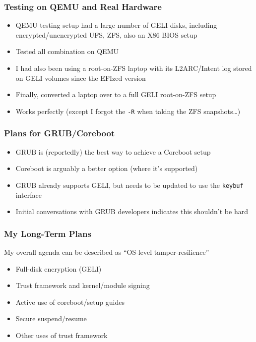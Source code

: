 \documentclass{beamer}
\begin{document}
\begin{frame}
  \frametitle{Testing on QEMU and Real Hardware}
  \begin{itemize}
  \item QEMU testing setup had a large number of GELI disks, including
    encrypted/unencrypted UFS, ZFS, also an X86 BIOS setup
  \item Tested all combination on QEMU
  \item I had also been using a root-on-ZFS laptop with its
    L2ARC/Intent log stored on GELI volumes since the EFIzed version
  \item Finally, converted a laptop over to a full GELI root-on-ZFS setup
  \item Works perfectly (except I forgot the \texttt{-R} when taking
    the ZFS snapshots\ldots)
  \end{itemize}
\end{frame}

\begin{frame}
  \frametitle{Plans for GRUB/Coreboot}
  \begin{itemize}
  \item GRUB is (reportedly) the best way to achieve a Coreboot setup
  \item Coreboot is arguably a better option (where it's supported)
  \item GRUB already supports GELI, but needs to be updated to use the
    \texttt{keybuf} interface
  \item Initial conversations with GRUB developers indicates this
    shouldn't be hard
  \end{itemize}
\end{frame}

\begin{frame}
  \frametitle{My Long-Term Plans}

  My overall agenda can be described as ``OS-level tamper-resilience''
  \begin{itemize}
  \item Full-disk encryption (GELI)
  \item Trust framework and kernel/module signing
  \item Active use of coreboot/setup guides
  \item Secure suspend/resume
  \item Other uses of trust framework
  \end{itemize}
\end{frame}
\end{document}
